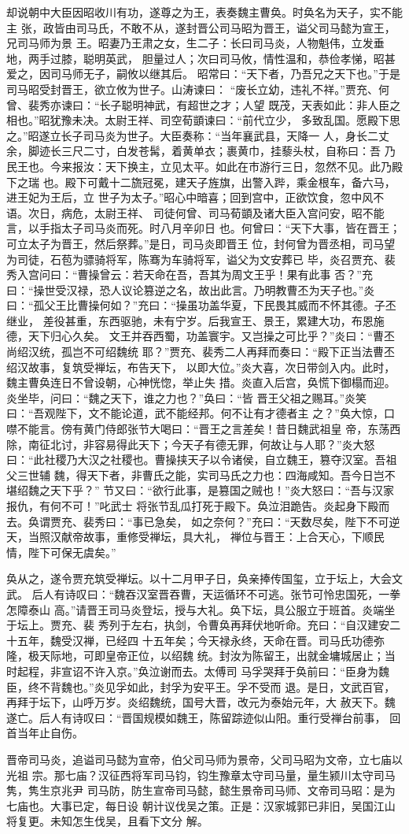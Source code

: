 却说朝中大臣因昭收川有功，遂尊之为王，表奏魏主曹奂。时奂名为天子，实不能主
张，政皆由司马氏，不敢不从，遂封晋公司马昭为晋王，谥父司马懿为宣王，兄司马师为景
王。昭妻乃王肃之女，生二子：长曰司马炎，人物魁伟，立发垂地，两手过膝，聪明英武，
胆量过人；次曰司马攸，情性温和，恭俭孝悌，昭甚爱之，因司马师无子，嗣攸以继其后。
昭常曰：“天下者，乃吾兄之天下也。”于是司马昭受封晋王，欲立攸为世子。山涛谏曰：
“废长立幼，违礼不祥。”贾充、何曾、裴秀亦谏曰：“长子聪明神武，有超世之才；人望
既茂，天表如此：非人臣之相也。”昭犹豫未决。太尉王祥、司空荀顗谏曰：“前代立少，
多致乱国。愿殿下思之。”昭遂立长子司马炎为世子。大臣奏称：“当年襄武县，天降一
人，身长二丈余，脚迹长三尺二寸，白发苍髯，着黄单衣；裹黄巾，挂藜头杖，自称曰：吾
乃民王也。今来报汝：天下换主，立见太平。如此在市游行三日，忽然不见。此乃殿下之瑞
也。殿下可戴十二旒冠冕，建天子旌旗，出警入跸，乘金根车，备六马，进王妃为王后，立
世子为太子。”昭心中暗喜；回到宫中，正欲饮食，忽中风不语。次日，病危，太尉王祥、
司徒何曾、司马荀顗及诸大臣入宫问安，昭不能言，以手指太子司马炎而死。时八月辛卯日
也。何曾曰：“天下大事，皆在晋王；可立太子为晋王，然后祭葬。”是日，司马炎即晋王
位，封何曾为晋丞相，司马望为司徒，石苞为骠骑将军，陈骞为车骑将军，谥父为文安葬已
毕，炎召贾充、裴秀入宫问曰：“曹操曾云：若天命在吾，吾其为周文王乎！果有此事
否？”充曰：“操世受汉禄，恐人议论篡逆之名，故出此言。乃明教曹丕为天子也。”炎
曰：“孤父王比曹操何如？”充曰：“操虽功盖华夏，下民畏其威而不怀其德。子丕继业，
差役甚重，东西驱驰，未有宁岁。后我宣王、景王，累建大功，布恩施德，天下归心久矣。
文王并吞西蜀，功盖寰宇。又岂操之可比乎？”炎曰：“曹丕尚绍汉统，孤岂不可绍魏统
耶？”贾充、裴秀二人再拜而奏曰：“殿下正当法曹丕绍汉故事，复筑受禅坛，布告天下，
以即大位。”炎大喜，次日带剑入内。此时，魏主曹奂连日不曾设朝，心神恍惚，举止失
措。炎直入后宫，奂慌下御榻而迎。炎坐毕，问曰：“魏之天下，谁之力也？”奂曰：“皆
晋王父祖之赐耳。”炎笑曰：“吾观陛下，文不能论道，武不能经邦。何不让有才德者主
之？”奂大惊，口噤不能言。傍有黄门侍郎张节大喝曰：“晋王之言差矣！昔日魏武祖皇
帝，东荡西除，南征北讨，非容易得此天下；今天子有德无罪，何故让与人耶？”炎大怒
曰：“此社稷乃大汉之社稷也。曹操挟天子以令诸侯，自立魏王，篡夺汉室。吾祖父三世辅
魏，得天下者，非曹氏之能，实司马氏之力也：四海咸知。吾今日岂不堪绍魏之天下乎？”
节又曰：“欲行此事，是篡国之贼也！”炎大怒曰：“吾与汉家报仇，有何不可！”叱武士
将张节乱瓜打死于殿下。奂泣泪跪告。炎起身下殿而去。奂谓贾充、裴秀曰：“事已急矣，
如之奈何？”充曰：“天数尽矣，陛下不可逆天，当照汉献帝故事，重修受禅坛，具大礼，
禅位与晋王：上合天心，下顺民情，陛下可保无虞矣。”

奂从之，遂令贾充筑受禅坛。以十二月甲子日，奂亲捧传国玺，立于坛上，大会文武。
后人有诗叹曰：“魏吞汉室晋吞曹，天运循环不可逃。张节可怜忠国死，一拳怎障泰山
高。”请晋王司马炎登坛，授与大礼。奂下坛，具公服立于班首。炎端坐于坛上。贾充、裴
秀列于左右，执剑，令曹奂再拜伏地听命。充曰：“自汉建安二十五年，魏受汉禅，已经四
十五年矣；今天禄永终，天命在晋。司马氏功德弥隆，极天际地，可即皇帝正位，以绍魏
统。封汝为陈留王，出就金墉城居止；当时起程，非宣诏不许入京。”奂泣谢而去。太傅司
马孚哭拜于奂前曰：“臣身为魏臣，终不背魏也。”炎见孚如此，封孚为安平王。孚不受而
退。是日，文武百官，再拜于坛下，山呼万岁。炎绍魏统，国号大晋，改元为泰始元年，大
赦天下。魏遂亡。后人有诗叹曰：“晋国规模如魏王，陈留踪迹似山阳。重行受禅台前事，
回首当年止自伤。

晋帝司马炎，追谥司马懿为宣帝，伯父司马师为景帝，父司马昭为文帝，立七庙以光祖
宗。那七庙？汉征西将军司马钧，钧生豫章太守司马量，量生颍川太守司马隽，隽生京兆尹
司马防，防生宣帝司马懿，懿生景帝司马师、文帝司马昭：是为七庙也。大事已定，每日设
朝计议伐吴之策。正是：汉家城郭已非旧，吴国江山将复更。未知怎生伐吴，且看下文分
解。